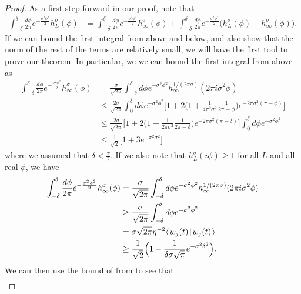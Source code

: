 \documentclass[../thesis-main/thesis-main]{subfiles}
\begin{document}
\begin{proof}
As a first step forward in our proof, note that
\begin{align}
  \int_{-\delta}^\delta \frac{d \phi}{2\pi} e^{-\frac{\sigma^2\phi^2}{2}} h_{L}^\sigma (\phi) &=  \int_{-\delta}^\delta \frac{d \phi}{2\pi} e^{-\frac{\sigma^2\phi^2}{2}} h_{\infty}^\sigma (\phi)  +  \int_{-\delta}^\delta \frac{d \phi}{2\pi} e^{-\frac{\sigma^2\phi^2}{2}} \big(h_{L}^\sigma (\phi) -h_\infty^\sigma(\phi)\big).
\end{align}
If we can bound the first integral from above and below, and also show that the norm of the rest of the terms are relatively small, we will have the first tool to prove our theorem.  In particular, we we can bound the first integral from above as
\begin{align}
   \int_{-\delta}^\delta \frac{d\phi}{2\pi} e^{-\frac{\sigma^2\phi^2}{2}} h_\infty^\sigma(\phi) &= \frac{\sigma}{\sqrt{2\pi}} \int_{-\delta}^\delta d\phi e^{-\sigma^2 \phi^2} h_{\infty}^{1/(2\pi\sigma)}(2\pi i \sigma^2 \phi)\\
   &\leq \frac{2\sigma}{\sqrt{2\pi}} \int_0^\delta d\phi e^{ - \sigma^2 \phi^2} \Big[ 1 + 2 \Big( 1 + \frac{1}{4\pi^2 \sigma^2} \frac{1}{ 2\pi - \phi}\Big) e^{ - 2\pi \sigma^2 (\pi - \phi)}\Big]\\
   & \leq \frac{2\sigma}{\sqrt{2\pi}} \Big[ 1 + 2 \Big( 1 + \frac{1}{2\pi \sigma^2} \frac{1}{ 2\pi - \delta }\Big) e^{ - 2\pi \sigma^2 (\pi - \delta)}\Big] \int_{0}^{\delta} d\phi e^{ - \sigma^2 \phi^2} \\
   &\leq \frac{1}{\sqrt{2}} \Big[ 1 + 3 e^{ - \pi^2 \sigma^2}\Big]\label{eq:gaussian_approx_gh}
\end{align}
where we assumed that $\delta < \frac{\pi}{2}$. If we also note that $h_L^\sigma(i\phi) \geq 1$ for all $L$ and all real $\phi$, we have 
\begin{align}
  \int_{-\delta}^\delta \frac{d\phi}{2\pi} e^{-\frac{\sigma^2\phi^2}{2}} h_\infty^\sigma(\phi) &= \frac{\sigma}{\sqrt{2\pi}} \int_{-\delta}^\delta d\phi e^{-\sigma^2 \phi^2} h_{\infty}^{1/(2\pi\sigma)}(2\pi i \sigma^2 \phi)\\
  &\geq \frac{\sigma}{\sqrt{2\pi}} \int_{-\delta}^\delta d\phi e^{-\sigma^2\phi^2} \\
  &= \sigma \sqrt{2\pi} \eta^{-2} \langle\mspace{2mu} w_j(t) \mspace{2mu} | \mspace{2mu} w_j(t)\mspace{2mu} \rangle\\
  & \geq \frac{1}{\sqrt{2}}\Big( 1 - \frac{1}{\delta \sigma \sqrt{\pi}} e^{-\sigma^2\delta^2}\Big).
\end{align}
We can then use the bound of  from  to see that
\begin{align}

\end{align}
\end{proof}
\end{document}
